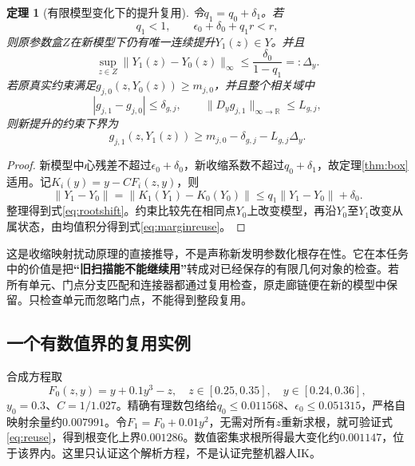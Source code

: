\documentclass[UTF8,11pt,a4paper,fontset=fandol]{ctexart}
\numberwithin{equation}{section}
\newtheorem{theorem}{定理}[section]
\theoremstyle{definition}
\newcommand{\R}{\mathbb R}
\begin{document}
\begin{theorem}[有限模型变化下的提升复用]\label{thm:reuse}
令$q_1=q_0+\delta_1$。若
\begin{equation}
 \boxed{q_1<1,\qquad \epsilon_0+\delta_0+q_1r<r,}
 \label{eq:reuse}
\end{equation}
则原参数盒$Z$在新模型下仍有唯一连续提升$Y_1(z)\in Y$。并且
\begin{equation}
 \boxed{\sup_{z\in Z}\|Y_1(z)-Y_0(z)\|_\infty
 \leq \frac{\delta_0}{1-q_1}=:\Delta_y.}
 \label{eq:rootshift}
\end{equation}
若原真实约束满足$g_{j,0}(z,Y_0(z))\geq m_{j,0}$，并且整个相关域中
\begin{equation}
 |g_{j,1}-g_{j,0}|\leq\delta_{g,j},\qquad
 \|D_yg_{j,1}\|_{\infty\to\R}\leq L_{g,j},
\end{equation}
则新提升的约束下界为
\begin{equation}
 \boxed{g_{j,1}(z,Y_1(z))
 \geq m_{j,0}-\delta_{g,j}-L_{g,j}\Delta_y.}
 \label{eq:marginreuse}
\end{equation}
\end{theorem}
\begin{proof}
新模型中心残差不超过$\epsilon_0+\delta_0$，新收缩系数不超过$q_0+\delta_1$，故定理\ref{thm:box}适用。记$K_i(y)=y-CF_i(z,y)$，则
\[
 \|Y_1-Y_0\|=\|K_1(Y_1)-K_0(Y_0)\|
 \leq q_1\|Y_1-Y_0\|+\delta_0.
\]
整理得到式\eqref{eq:rootshift}。约束比较先在相同点$Y_0$上改变模型，再沿$Y_0$至$Y_1$改变从属状态，由均值积分得到式\eqref{eq:marginreuse}。
\end{proof}

这是收缩映射扰动原理的直接推导，不是声称新发明参数化根存在性。它在本任务中的价值是把\textbf{“旧扫描能不能继续用”}转成对已经保存的有限几何对象的检查。若所有单元、门点分支匹配和连接器都通过复用检查，原走廊链便在新的模型中保留。只检查单元而忽略门点，不能得到整段复用。

\subsection{一个有数值界的复用实例}
合成方程取
\begin{equation}
 F_0(z,y)=y+0.1y^3-z,\quad
 z\in[0.25,0.35],\quad y\in[0.24,0.36],
\end{equation}
$y_0=0.3$、$C=1/1.027$。精确有理数包络给$q_0\leq0.011568$、$\epsilon_0\leq0.051315$，严格自映射余量约$0.007991$。令$F_1=F_0+0.01y^2$，无需对所有$z$重新求根，就可验证式\eqref{eq:reuse}，得到根变化上界$0.001286$。数值密集求根所得最大变化约$0.001147$，位于该界内。这里只认证这个解析方程，不是认证完整机器人IK。
\end{document}
